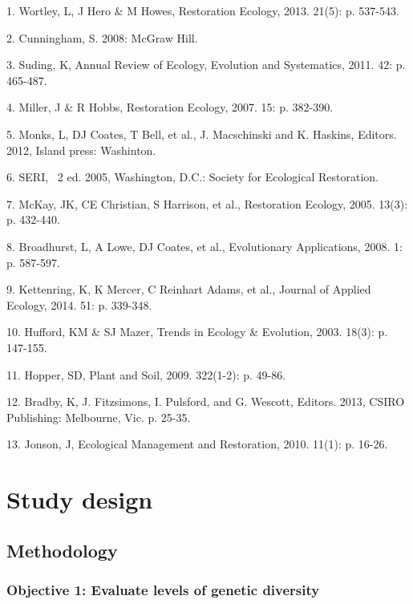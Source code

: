 \documentclass[version=last,
    paper=a4,                               %
    10pt,                                   %
    dvipsnames,
    oneside,                              %
    headings=openany,                       %
    open=any,
    BCOR=7mm,                               %
    DIV=15,     %
]{scrbook}
\begin{document}
1. Wortley, L, J Hero \& M Howes, Restoration Ecology, 2013. 21(5): p.
537-543.

2. Cunningham, S. 2008: McGraw Hill.

3. Suding, K, Annual Review of Ecology, Evolution and Systematics, 2011.
42: p. 465-487.

4. Miller, J \& R Hobbs, Restoration Ecology, 2007. 15: p. 382-390.

5. Monks, L, DJ Coates, T Bell, et al., J. Macschinski and K. Haskins,
Editors. 2012, Island press: Washinton.

6. SERI,~ 2 ed. 2005, Washington, D.C.: Society for Ecological
Restoration.

7. McKay, JK, CE Christian, S Harrison, et al., Restoration Ecology,
2005. 13(3): p. 432-440.

8. Broadhurst, L, A Lowe, DJ Coates, et al., Evolutionary Applications,
2008. 1: p. 587-597.

9. Kettenring, K, K Mercer, C Reinhart Adams, et al., Journal of Applied
Ecology, 2014. 51: p. 339-348.

10. Hufford, KM \& SJ Mazer, Trends in Ecology \& Evolution, 2003.
18(3): p. 147-155.

11. Hopper, SD, Plant and Soil, 2009. 322(1-2): p. 49-86.

12. Bradby, K, J. Fitzsimons, I. Pulsford, and G. Wescott, Editors.
2013, CSIRO Publishing: Melbourne, Vic. p. 25-35.

13. Jonson, J, Ecological Management and Restoration, 2010. 11(1): p.
16-26.



\section*{Study design}


\subsection*{Methodology}

\hypertarget{objective-1-evaluate-levels-of-genetic-diversity}{%
\subsubsection{Objective 1: Evaluate levels of genetic
diversity}\label{objective-1-evaluate-levels-of-genetic-diversity}}
\end{document}
